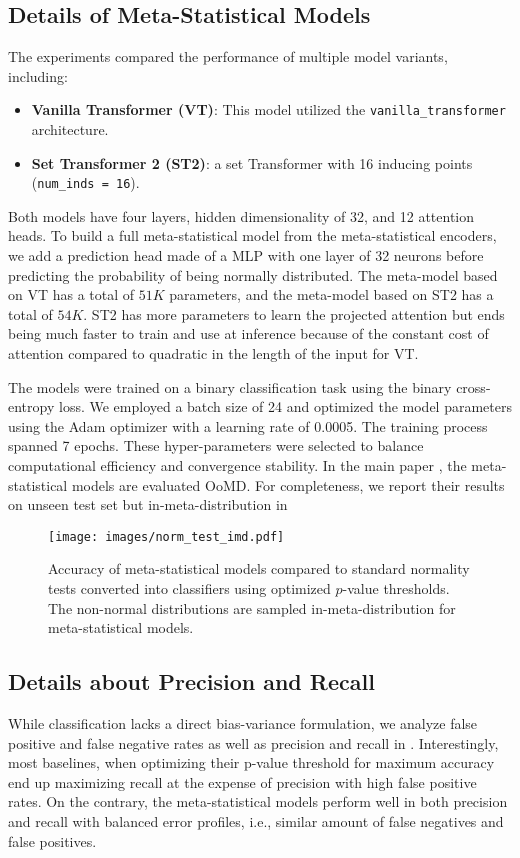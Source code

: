 \subsection{Details of Meta-Statistical Models}
The experiments compared the performance of multiple model variants, including:
\begin{itemize}
    \item \textbf{Vanilla Transformer (VT)}: This model utilized the \texttt{vanilla\_transformer} architecture.
    \item \textbf{Set Transformer 2 (ST2)}: a set Transformer with 16 inducing points (\texttt{num\_inds = 16}).
\end{itemize}
Both models have four layers, hidden dimensionality of 32, and 12 attention heads. To build a full meta-statistical model from the meta-statistical encoders, we add a prediction head made of a MLP with one layer of 32 neurons before predicting the probability of being normally distributed. The meta-model based on VT has a total of $51K$ parameters, and the meta-model based on ST2 has a total of $54K$. ST2 has more parameters to learn the projected attention but ends being much faster to train and use at inference because of the constant cost of attention compared to quadratic in the length of the input for VT.

The models were trained on a binary classification task using the binary cross-entropy loss. We employed a batch size of 24 and optimized the model parameters using the Adam optimizer with a learning rate of 0.0005. The training process spanned 7 epochs. These hyper-parameters were selected to balance computational efficiency and convergence stability. In the main paper , the meta-statistical models are evaluated OoMD. For completeness, we report their results on unseen test set but in-meta-distribution in 

\begin{figure}
    \centering
    \texttt{[image: images/norm\_test\_imd.pdf]}
    \caption{Accuracy of meta-statistical models compared to standard normality tests converted into classifiers using optimized \( p \)-value thresholds. The non-normal distributions are sampled in-meta-distribution for meta-statistical models.}
    \label{fig:norm_t_imd}
\end{figure}


\subsection{Details about Precision and Recall}
\label{app:prec_rec}
While classification lacks a direct bias-variance formulation, we analyze false positive and false negative rates as well as precision and recall in . Interestingly, most baselines, when optimizing their p-value threshold for maximum accuracy end up maximizing recall at the expense of precision with high false positive rates. On the contrary, the meta-statistical models perform well in both precision and recall with balanced error profiles, i.e., similar amount of false negatives and false positives.

